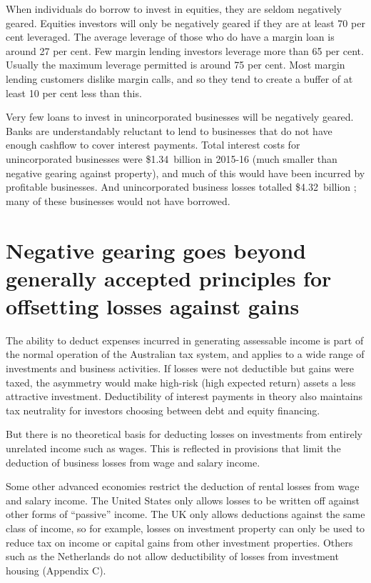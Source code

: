 \documentclass{grattan}\usepackage[]{graphicx}\usepackage[]{color}
\begin{document}
When individuals do borrow to invest in equities, they are seldom negatively geared. Equities investors will only be negatively geared if they are at least 70 per cent leveraged.  The average leverage of those who do have a margin loan is around 27 per cent.  Few margin lending investors leverage more than 65 per cent. Usually the maximum leverage permitted is around 75 per cent. Most margin lending customers dislike margin calls, and so they tend to create a buffer of at least 10 per cent less than this. 





Very few loans to invest in unincorporated businesses will be negatively geared. Banks are understandably reluctant to lend to businesses that do not have enough cashflow to cover interest payments. Total interest costs for unincorporated businesses were \$1.34~billion in 2015-16  (much smaller than negative gearing against property), and much of this would have been incurred by profitable businesses. And unincorporated business losses totalled \$4.32~billion ; many of these businesses would not have borrowed. 

\section{Negative gearing goes beyond generally accepted principles for offsetting losses against gains}
The ability to deduct expenses incurred in generating assessable income is part of the normal operation of the Australian tax system, and applies to a wide range of investments and business activities. If losses were not deductible but gains were taxed, the asymmetry would make high-risk (high expected return) assets a less attractive investment. Deductibility of interest payments in theory also maintains tax neutrality for investors choosing between debt and equity financing.  

But there is no theoretical basis for deducting losses on investments from entirely unrelated income such as wages. This is reflected in provisions that limit the deduction of business losses from wage and salary income. 

Some other advanced economies restrict the deduction of rental losses from wage and salary income. The United States only allows losses to be written off against other forms of ``passive'' income.  The UK only allows deductions against the same class of income, so for example, losses on investment property can only be used to reduce tax on income or capital gains from other investment properties. Others such as the Netherlands do not allow deductibility of losses from investment housing (Appendix C). 
\end{document}
